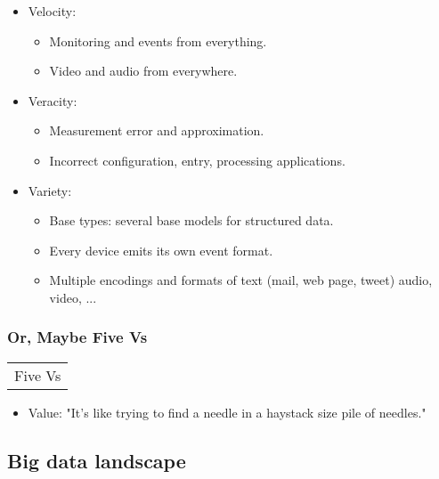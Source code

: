 \documentclass[11pt]{article}
\providecommand{\tightlist}{%
      \setlength{\itemsep}{0pt}\setlength{\parskip}{0pt}}
\begin{document}
\begin{itemize}
\tightlist
\item
  Velocity:

  \begin{itemize}
  \tightlist
  \item
    Monitoring and events from everything.
  \item
    Video and audio from everywhere.
  \end{itemize}
\item
  Veracity:

  \begin{itemize}
  \tightlist
  \item
    Measurement error and approximation.
  \item
    Incorrect configuration, entry, processing applications.
  \end{itemize}
\item
  Variety:

  \begin{itemize}
  \tightlist
  \item
    Base types: several base models for structured data.
  \item
    Every device emits its own event format.
  \item
    Multiple encodings and formats of text (mail, web page, tweet)
    audio, video, ...
  \end{itemize}
\end{itemize}

    \subsubsection{Or, Maybe Five Vs}\label{or-maybe-five-vs}

\begin{longtable}[]{@{}c@{}}
\toprule
\tabularnewline
\midrule
\endhead
Five Vs\tabularnewline
\bottomrule
\end{longtable}

    \begin{itemize}
\tightlist
\item
  Value: "It's like trying to find a needle in a haystack size pile of
  needles."
\end{itemize}

    \subsection{Big data landscape}\label{big-data-landscape}
\end{document}
